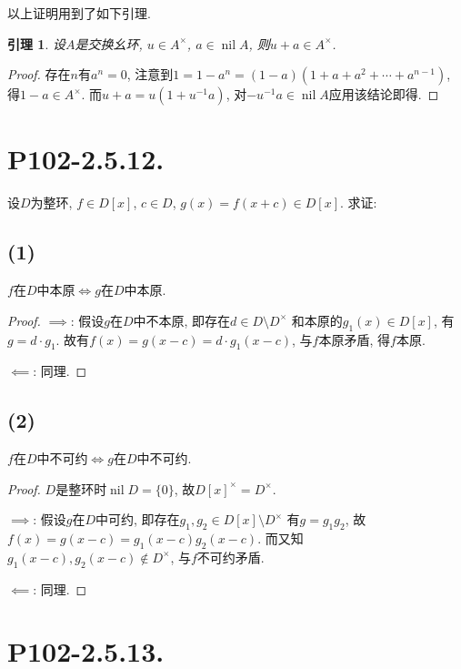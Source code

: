 \documentclass[12pt, a4paper, fontset=windows]{ctexart}
\newcommand{\nil}{\operatorname{nil}}
\newcommand{\unit}[1]{{#1}^\times}
\newtheorem*{lemma}{引理}
\begin{document}
以上证明用到了如下引理. 

\begin{lemma}
设$A$是交换幺环, $u\in\unit{A}$, $a\in\nil A$, 则$u+a\in\unit{A}$. 
\end{lemma}

\begin{proof}
存在$n$有$a^n=0$, 注意到$1=1-a^n=(1-a)(1+a+a^2+\cdots+a^{n-1})$, 
得$1-a\in\unit{A}$. 而$u+a=u(1+u^{-1}a)$, 对$-u^{-1}a\in\nil A$应用该结论即得. 
\end{proof}

\section*{P102-2.5.12.}

设$D$为整环, $f\in D[x]$, $c\in D$, $g(x)=f(x+c)\in D[x]$. 求证: 

\subsection*{(1)}

$f$在$D$中本原$\iff g$在$D$中本原. 

\begin{proof}
$\implies$: 假设$g$在$D$中不本原, 即存在$d\in D\setminus\unit{D}$
和本原的$g_1(x)\in D[x]$, 有$g=d\cdot g_1$. 
故有$f(x)=g(x-c)=d\cdot g_1(x-c)$, 与$f$本原矛盾, 得$f$本原. 

$\impliedby$: 同理. 
\end{proof}

\subsection*{(2)}
\label{irr-translation}

$f$在$D$中不可约$\iff g$在$D$中不可约. 

\begin{proof}
$D$是整环时$\nil D=\{0\}$, 故$\unit{D[x]}=\unit{D}$. 

$\implies$: 假设$g$在$D$中可约, 即存在$g_1,g_2\in D[x]\setminus\unit{D}$
有$g=g_1g_2$, 故$f(x)=g(x-c)=g_1(x-c)g_2(x-c)$. 
而又知$g_1(x-c),g_2(x-c)\notin\unit{D}$, 与$f$不可约矛盾. 

$\impliedby$: 同理. 
\end{proof}

\section*{P102-2.5.13.}
\end{document}
